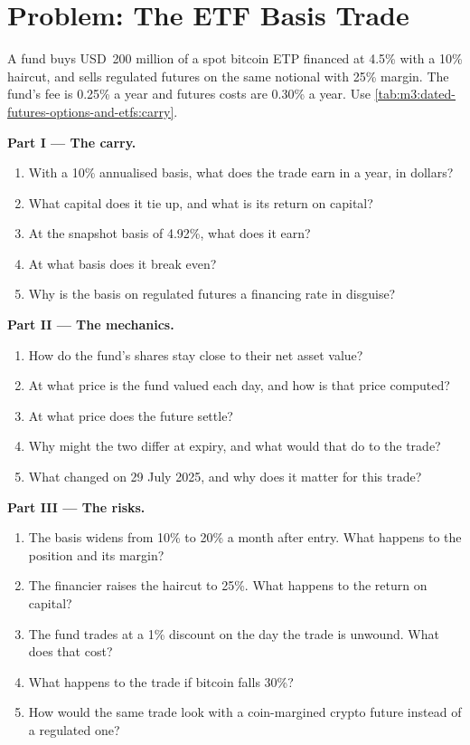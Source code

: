 \section{Problem: The ETF Basis Trade}

\begin{problem}\label{pb:m3:dated-futures-options-and-etfs:1}
A fund buys USD~200 million of a spot bitcoin ETP financed at 4.5\% with a 10\% haircut, and sells regulated futures on the same notional
with 25\% margin. The fund's fee is 0.25\% a year and futures costs are 0.30\% a year. Use \cref{tab:m3:dated-futures-options-and-etfs:carry}.

\medskip\noindent\textbf{Part I --- The carry.}
\begin{enumerate}
\item With a 10\% annualised basis, what does the trade earn in a year, in dollars?
\item What capital does it tie up, and what is its return on capital?
\item At the snapshot basis of 4.92\%, what does it earn?
\item At what basis does it break even?
\item Why is the basis on regulated futures a financing rate in disguise?
\end{enumerate}

\medskip\noindent\textbf{Part II --- The mechanics.}
\begin{enumerate}[resume]
\item How do the fund's shares stay close to their net asset value?
\item At what price is the fund valued each day, and how is that price computed?
\item At what price does the future settle?
\item Why might the two differ at expiry, and what would that do to the trade?
\item What changed on 29 July 2025, and why does it matter for this trade?
\end{enumerate}

\medskip\noindent\textbf{Part III --- The risks.}
\begin{enumerate}[resume]
\item The basis widens from 10\% to 20\% a month after entry. What happens to the position and its margin?
\item The financier raises the haircut to 25\%. What happens to the return on capital?
\item The fund trades at a 1\% discount on the day the trade is unwound. What does that cost?
\item What happens to the trade if bitcoin falls 30\%?
\item How would the same trade look with a coin-margined crypto future instead of a regulated one?
\end{enumerate}


\end{problem}
